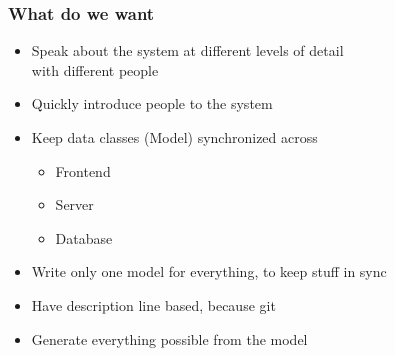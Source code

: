 \documentclass[xelatex,14pt]{beamer}
\begin{document}
\begin{frame}
	\frametitle{What do we want}
	\begin{itemize}
		\item Speak about the system at different levels of detail\\
		with different people
		\item Quickly introduce people to the system
		\item Keep data classes (Model) synchronized across
		\begin{itemize}
			\item Frontend
			\item Server
			\item Database
		\end{itemize}
		\item Write only one model for everything, to keep stuff in sync
		\item Have description line based, because git
		\item Generate everything possible from the model
	\end{itemize}
\end{frame}
\end{document}
